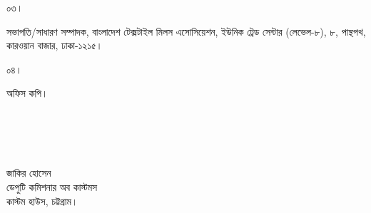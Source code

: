 \documentclass[12pt]{article}
\begin{document}
\begin{minipage}[t]{0.06\linewidth}
\footnotesize{০৩।}
\end{minipage}
\begin{minipage}[t]{0.94\linewidth}
সভাপতি/সাধারণ সম্পাদক, বাংলাদেশ টেক্সটাইল
মিলস এসোসিয়েশন, ইউনিক ট্রেড সেন্টার (লেভেল-৮),
৮, পান্থপথ, কারওয়ান বাজার, ঢাকা-১২১৫।
\end{minipage}
\begin{minipage}[t]{0.06\linewidth}
\footnotesize{০৪।}
\end{minipage}
\begin{minipage}[t]{0.94\linewidth}
 অফিস কপি।
 \\
 \\
 \\
 \\
 \\
\end{minipage}
\begin{minipage}[t]{0.60\linewidth}
\hspace{1em}
\end{minipage}
\normalsize
\begin{minipage}[t]{0.40\linewidth}
\begin{center}
জাকির হোসেন
\\
ডেপুটি কমিশনার অব কাস্টমস
\\
কাস্টম হাউস, চট্টগ্রাম।
\end{center}
\end{minipage}
\thispagestyle{slogan}
\end{document}
